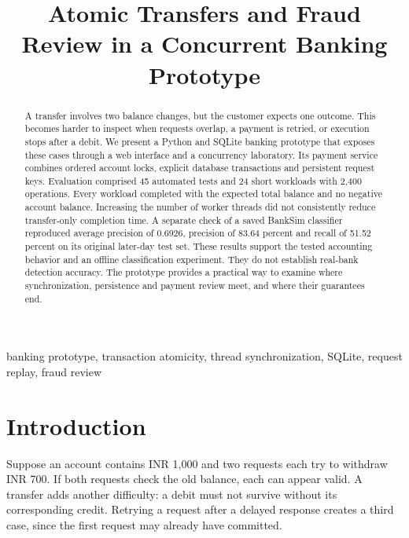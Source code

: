 \documentclass[conference]{IEEEtran}
\begin{document}
\title{Atomic Transfers and Fraud Review in a Concurrent Banking Prototype}
\author{
}
\maketitle

\begin{abstract}
A transfer involves two balance changes, but the customer expects one outcome. This becomes harder to inspect when requests overlap, a payment is retried, or execution stops after a debit. We present a Python and SQLite banking prototype that exposes these cases through a web interface and a concurrency laboratory. Its payment service combines ordered account locks, explicit database transactions and persistent request keys. Evaluation comprised 45 automated tests and 24 short workloads with 2,400 operations. Every workload completed with the expected total balance and no negative account balance. Increasing the number of worker threads did not consistently reduce transfer-only completion time. A separate check of a saved BankSim classifier reproduced average precision of 0.6926, precision of 83.64 percent and recall of 51.52 percent on its original later-day test set. These results support the tested accounting behavior and an offline classification experiment. They do not establish real-bank detection accuracy. The prototype provides a practical way to examine where synchronization, persistence and payment review meet, and where their guarantees end.
\end{abstract}
\begin{IEEEkeywords}
banking prototype, transaction atomicity, thread synchronization,
SQLite, request replay, fraud review
\end{IEEEkeywords}

\section{Introduction}
Suppose an account contains INR 1,000 and two requests each try to withdraw INR 700. If both requests check the old balance, each can appear valid. A transfer adds another difficulty: a debit must not survive without its corresponding credit. Retrying a request after a delayed response creates a third case, since the first request may already have committed.
\end{document}
